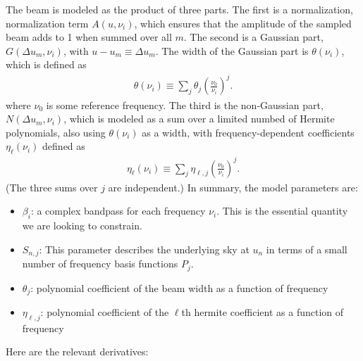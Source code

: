 \documentclass[]{article}
\begin{document}
The beam is modeled as the product of three parts. The first is a normalization, normalization term $A(u,\nu_i)$, which ensures that the amplitude of the sampled beam adds to 1 when summed over all $m$. The second is a Gaussian part, $G(\Delta u_m,\nu_i)$, with $u-u_m \equiv \Delta u_m$. The width of the  Gaussian part is $\theta(\nu_i)$, which is defined as
\begin{align}
\theta(\nu_i) \equiv \sum_{j} \theta_j \left(\frac{\nu_0}{\nu_i}\right)^j.
\end{align} 
where $\nu_0$ is some reference frequency. The third is the non-Gaussian part, $N(\Delta u_m,\nu_i)$, which is modeled as a sum over a limited numbed of Hermite polynomials, also using $\theta(\nu_i)$ as a width, with frequency-dependent coefficients $\eta_\ell(\nu_i)$ defined as 
\begin{align}
\eta_\ell(\nu_i) \equiv \sum_{j} \eta_{\ell,j} \left(\frac{\nu_0}{\nu_i}\right)^j.
\end{align} 
(The three sums over $j$ are independent.) In summary, the model parameters are:
\begin{itemize}
\item $\beta_i$: a complex bandpass for each frequency $\nu_i$. This is the essential quantity we are looking to constrain.
\item $S_{n,j}$: This parameter describes the underlying sky at $u_n$ in terms of a small number of frequency basis functions $P_j$.
\item $\theta_j$: polynomial coefficient of the beam width as a function of frequency
\item $\eta_{\ell,j}$: polynomial coefficient of the $\ell$th hermite coefficient as a function of frequency
\end{itemize}

\noindent Here are the relevant derivatives:
\end{document}

